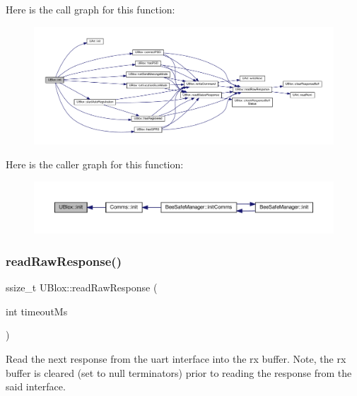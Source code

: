 Here is the call graph for this function\+:
\nopagebreak
\begin{figure}[H]
\begin{center}
\leavevmode
\includegraphics[width=350pt]{da/df6/class_u_blox_a34c2f507ff3bbd21b9aea788a015527a_cgraph}
\end{center}
\end{figure}
Here is the caller graph for this function\+:
\nopagebreak
\begin{figure}[H]
\begin{center}
\leavevmode
\includegraphics[width=350pt]{da/df6/class_u_blox_a34c2f507ff3bbd21b9aea788a015527a_icgraph}
\end{center}
\end{figure}
\mbox{\label{class_u_blox_ab4a7ab4b8922d91e23f273ae160c1bed}} 
\subsubsection{\texorpdfstring{read\+Raw\+Response()}{readRawResponse()}}
{\footnotesize\ttfamily ssize\+\_\+t U\+Blox\+::read\+Raw\+Response (\begin{DoxyParamCaption}\item[{int}]{timeout\+Ms }\end{DoxyParamCaption})\hspace{0.3cm}{\ttfamily [private]}}

Read the next response from the uart interface into the rx buffer. Note, the rx buffer is cleared (set to null terminators) prior to reading the response from the said interface.


